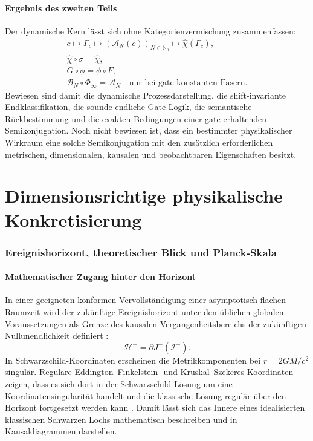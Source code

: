 \documentclass[11pt,a4paper]{article}
\theoremstyle{remark}
\newcommand{\N}{\mathbb{N}}
\begin{document}
\subsection{Ergebnis des zweiten Teils}

Der dynamische Kern lässt sich ohne Kategorienvermischung zusammenfassen:
\[
\boxed{
\begin{gathered}
  c\longmapsto\Gamma_c
  \longmapsto(\mathcal A_N(c))_{N\in\N_0}
  \longmapsto\widehat\chi(\Gamma_c),\\[0.3em]
  \widehat\chi\circ\sigma=\widehat\chi,\\[0.3em]
  G\circ\phi=\phi\circ F,\\[0.3em]
  \mathcal B_N\circ\Phi_\infty=\mathcal A_N
  \quad\text{nur bei gate-konstanten Fasern}.
\end{gathered}}
\]
Bewiesen sind damit die dynamische Prozessdarstellung, die shift-invariante
Endklassifikation, die sounde endliche Gate-Logik, die semantische
Rückbestimmung und die exakten Bedingungen einer gate-erhaltenden
Semikonjugation. Noch nicht bewiesen ist, dass ein bestimmter physikalischer
Wirkraum eine solche Semikonjugation mit den zusätzlich erforderlichen
metrischen, dimensionalen, kausalen und beobachtbaren Eigenschaften besitzt.

\part{Dimensionsrichtige physikalische Konkretisierung}

\section{Ereignishorizont, theoretischer Blick und Planck-Skala}
\label{sec:physik}

\subsection{Mathematischer Zugang hinter den Horizont}

In einer geeigneten konformen Vervollständigung einer asymptotisch flachen
Raumzeit wird der zukünftige Ereignishorizont unter den üblichen globalen
Voraussetzungen als Grenze des kausalen Vergangenheitsbereichs der
zukünftigen Nullunendlichkeit definiert \citep{wald1984}:
\[
  \mathcal H^+=\partial J^{-}(\mathcal I^+).
\]
In Schwarzschild-Koordinaten erscheinen die Metrikkomponenten bei
\(r=2GM/c^2\) singulär. Reguläre Eddington--Finkelstein- und
Kruskal--Szekeres-Koordinaten zeigen, dass es sich dort in der
Schwarzschild-Lösung um eine Koordinatensingularität handelt und die
klassische Lösung regulär über den Horizont fortgesetzt werden kann
\citep{finkelstein1958,kruskal1960}. Damit lässt sich das Innere eines
idealisierten klassischen Schwarzen Lochs mathematisch beschreiben und in
Kausaldiagrammen darstellen.
\end{document}
